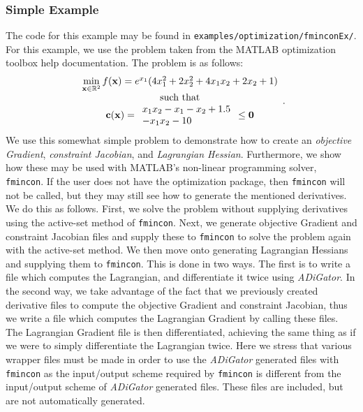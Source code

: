 \documentclass[10pt,pdftex]{article}
\begin{document}
\subsubsection{Simple Example}
The code for this example may be found in \texttt{examples/optimization/fminconEx/}.
For this example, we use the problem taken from the MATLAB optimization toolbox help documentation. The problem is as follows:
\begin{equation}
\begin{array}{c}
\min\limits_{\mathbf{x} \in \mathbb{R}^2}  f(\mathbf{x}) = e^{x_1}(4x_1^2+2x_2^2+4x_1x_2+2x_2+1)\\
\text{such that}\\
\mathbf{c}(\mathbf{x}) = 
\begin{array}{ll}
x_1x_2 - x_1-x_2+1.5 \\
-x_1x_2-10
\end{array} \leq \textbf{0}
\end{array}.
\end{equation}
We use this somewhat simple problem to demonstrate how to create an \emph{objective Gradient}, \emph{constraint Jacobian}, and \emph{Lagrangian Hessian}. Furthermore, we show how these may be used with MATLAB's non-linear programming solver, \texttt{fmincon}. If the user does not have the optimization package, then \texttt{fmincon} will not be called, but they may still see how to generate the mentioned derivatives. We do this as follows. First, we solve the problem without supplying derivatives using the active-set method of \texttt{fmincon}. Next, we generate objective Gradient and constraint Jacobian files and supply these to \texttt{fmincon} to solve the problem again with the active-set method. We then move onto generating Lagrangian Hessians and supplying them to \texttt{fmincon}. This is done in two ways. The first is to write a file which computes the Lagrangian, and differentiate it twice using \emph{ADiGator}. In the second way, we take advantage of the fact that we previously created derivative files to compute the objective Gradient and constraint Jacobian, thus we write a file which computes the Lagrangian Gradient by calling these files. The Lagrangian Gradient file is then differentiated, achieving the same thing as if we were to simply differentiate the Lagrangian twice.
Here we stress that various wrapper files must be made in order to use the \emph{ADiGator} generated files with \texttt{fmincon} as the input/output scheme required by \texttt{fmincon} is different from the input/output scheme of \emph{ADiGator} generated files. These files are included, but are not automatically generated.
\end{document}
